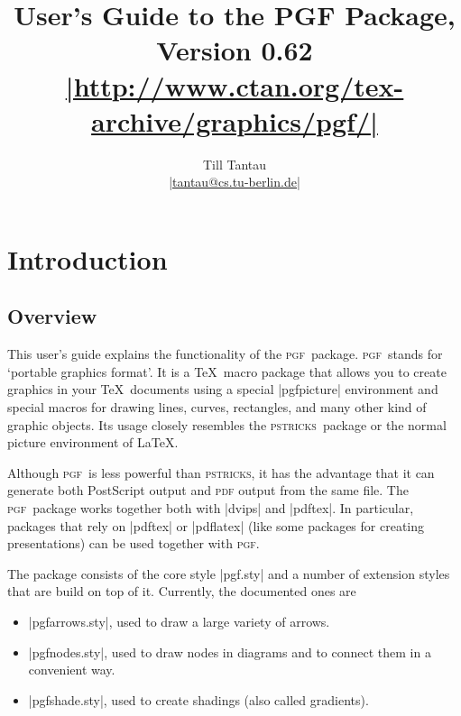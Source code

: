 \documentclass{ltxdoc}
\def\pgf{\textsc{pgf}}
\def\pstricks{\textsc{pstricks}}
\begin{document}
\title{User's Guide to the PGF Package, Version 0.62\\
  \Large\href{http://www.ctan.org/tex-archive/graphics/pgf/}{|http://www.ctan.org/tex-archive/graphics/pgf/|}}
\author{Till Tantau\\
  \href{mailto:tantau@cs.tu-berlin.de}{|tantau@cs.tu-berlin.de|}}


\maketitle

\tableofcontents

\section{Introduction}

\subsection{Overview}

This user's guide explains the functionality of the \pgf\ package.
\pgf\ stands for `portable graphics format'. It is a \TeX\ macro
package that allows you to create graphics in your \TeX\ documents
using a special |pgfpicture| environment and special macros for
drawing lines, curves, rectangles, and many other kind of graphic
objects. Its usage closely resembles the \pstricks\ package or the
normal picture environment of \LaTeX.

Although \pgf\ is less powerful than \pstricks, it has the advantage
that it can generate both PostScript output and \textsc{pdf} output
from the same file. The \pgf\ package works together both with
|dvips| and |pdftex|. In particular, packages that rely
on |pdftex| or |pdflatex| (like some packages for
creating presentations) can be used together with \pgf.

The package consists of the core style |pgf.sty| and a number
of extension styles that are build on top of it. Currently, the
documented ones are
\begin{itemize}\itemsep=0pt\parskip=0pt
\item
  |pgfarrows.sty|, used to draw a large variety of arrows.
\item
  |pgfnodes.sty|, used to draw nodes in diagrams and to connect
  them in a convenient way.
\item
  |pgfshade.sty|, used to create shadings (also called
  gradients). 
\end{itemize}
\end{document}
